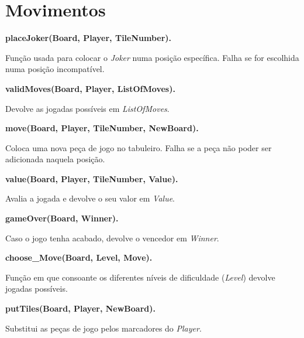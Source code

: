 \documentclass[a4paper]{article}
\begin{document}
\section{Movimentos\newline}

\begin{center}
\textbf{placeJoker(Board, Player, TileNumber).}
\end{center}
Função usada para colocar o \textit{Joker} numa posição específica. Falha se for escolhida numa posição incompatível.\newline

\begin{center}
\textbf{validMoves(Board, Player, ListOfMoves).}
\end{center}
Devolve as jogadas possíveis em \textit{ListOfMoves}.\newline

\begin{center}
\textbf{move(Board, Player, TileNumber, NewBoard).}
\end{center}
Coloca uma nova peça de jogo no tabuleiro. Falha se a peça não poder ser adicionada naquela posição.\newline

\begin{center}
\textbf{value(Board, Player, TileNumber, Value).}
\end{center}
Avalia a jogada e devolve o seu valor em \textit{Value}.\newline

\begin{center}
\textbf{gameOver(Board, Winner).}
\end{center}
Caso o jogo tenha acabado, devolve o vencedor em \textit{Winner}.\newline

\begin{center}
\textbf{choose\_Move(Board, Level, Move).}
\end{center}
Função em que consoante os diferentes níveis de dificuldade (\textit{Level}) devolve jogadas possíveis.\newline

\begin{center}
\textbf{putTiles(Board, Player, NewBoard).}
\end{center}
Substitui as peças de jogo pelos marcadores do \textit{Player}.
\end{document}
